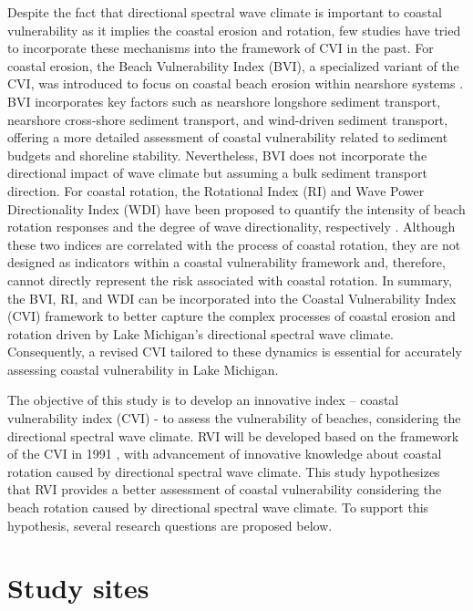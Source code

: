 Despite the fact that directional spectral wave climate is important to coastal
vulnerability as it implies the coastal erosion and rotation, few studies have
tried to incorporate these mechanisms into the framework of CVI in the past. For
coastal erosion, the Beach Vulnerability Index (BVI), a specialized variant of
the CVI, was introduced to focus on coastal beach erosion within nearshore
systems \citep{alexandrakis_holistic_2014}. BVI incorporates key factors such as
nearshore longshore sediment transport, nearshore cross-shore sediment
transport, and wind-driven sediment transport, offering a more detailed
assessment of coastal vulnerability related to sediment budgets and shoreline
stability. Nevertheless, BVI does not incorporate the directional impact of wave
climate but assuming a bulk sediment transport direction. For coastal rotation,
the Rotational Index (RI) and Wave Power Directionality Index (WDI) have been
proposed to quantify the intensity of beach rotation responses and the degree of
wave directionality, respectively
\citep{wiggins_coastal_2019,wiggins_regionally-coherent_2019}. Although these
two indices are correlated with the process of coastal rotation, they are not
designed as indicators within a coastal vulnerability framework and, therefore,
cannot directly represent the risk associated with coastal rotation. In summary,
the BVI, RI, and WDI can be incorporated into the Coastal Vulnerability Index
(CVI) framework to better capture the complex processes of coastal erosion and
rotation driven by Lake Michigan's directional spectral wave climate.
Consequently, a revised CVI tailored to these dynamics is essential for
accurately assessing coastal vulnerability in Lake Michigan.

The objective of this study is to develop an innovative index – coastal 
vulnerability index (CVI) - to assess the vulnerability of beaches, considering
the directional spectral wave climate. RVI will be developed based on the
framework of the CVI in 1991 \citep{gornitz_global_1991}, with advancement of innovative
knowledge about coastal rotation caused by directional spectral wave climate.
This study hypothesizes that RVI provides a better assessment of coastal
vulnerability considering the beach rotation caused by directional spectral wave
climate. To support this hypothesis, several research questions are proposed
below.

\section{Study sites}
\label{c5_Study sites}

